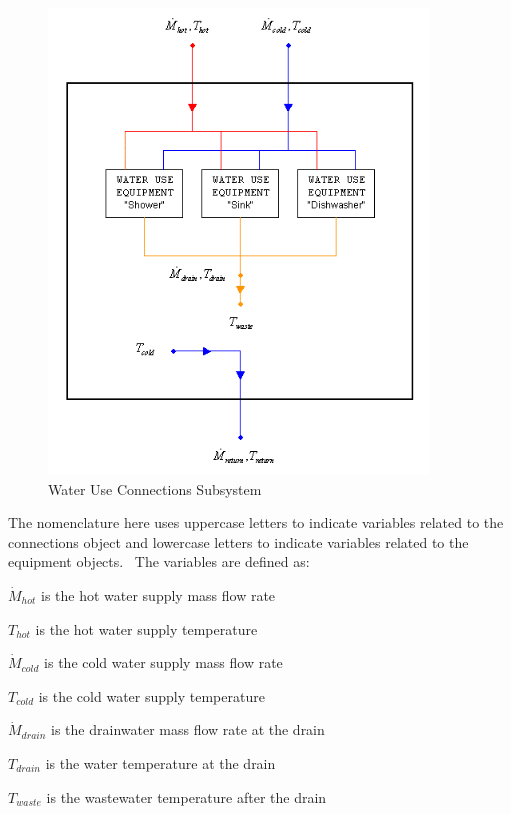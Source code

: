 \begin{figure}[hbtp] %
\centering
\includegraphics[width=0.9\textwidth, height=0.9\textheight, keepaspectratio=true]{media/image7005.png}
\caption{Water Use Connections Subsystem \protect \label{fig:water-use-connections-subsystem}}
\end{figure}

The nomenclature here uses uppercase letters to indicate variables related to the connections object and lowercase letters to indicate variables related to the equipment objects.~ The variables are defined as:

\({\dot M_{hot}}\) is the hot water supply mass flow rate

\({T_{hot}}\) is the hot water supply temperature

\({\dot M_{cold}}\) is the cold water supply mass flow rate

\({T_{cold}}\) is the cold water supply temperature

\({\dot M_{drain}}\) is the drainwater mass flow rate at the drain

\({T_{drain}}\) is the water temperature at the drain

\({T_{waste}}\) is the wastewater temperature after the drain

